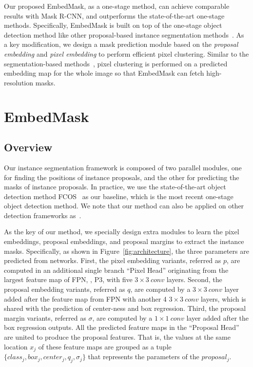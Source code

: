 \documentclass[10pt,twocolumn,letterpaper]{article}
\begin{document}
Our proposed EmbedMask, as a one-stage method, can achieve comparable results with Mask R-CNN, and outperforms the state-of-the-art one-stage methods. 
Specifically, EmbedMask is built on top of the one-stage object detection method like other proposal-based instance segmentation methods~\cite{chen2018masklab,he2017mask}. 
As a key modification, we design a mask prediction module based on the \emph{proposal embedding} and \emph{pixel embedding} to perform efficient pixel clustering. 
Similar to the segmentation-based methods~\cite{de2017semantic,neven2019instance}, pixel clustering is performed on a predicted embedding map for the whole image so that EmbedMask can fetch high-resolution masks. 

\section{EmbedMask}

\subsection{Overview}

Our instance segmentation framework is composed of two parallel modules, one for finding the positions of instance proposals, and the other for predicting the masks of instance proposals. 
In practice, we use the state-of-the-art object detection method FCOS~\cite{tian2019fcos} as our baseline, which is the most recent one-stage object detection method. We note that our method can also be applied on other detection frameworks as~\cite{lin2017focal,liu2016ssd,redmon2016you}.

As the key of our method, we specially design extra modules to learn the pixel embeddings, proposal embeddings, and proposal margins to extract the instance masks.
Specifically, as shown in Figure~\ref{fig:architecture}, the three parameters are predicted from networks. 
First, the pixel embedding variants, referred as $p$, are computed in an additional single branch ``Pixel Head'' originating from the largest feature map of FPN, \ie, P3, with five $3\times3\ conv$ layers.
Second, the proposal embedding variants, referred as $q$, are computed by a $3\times3\ conv$ layer added after the feature map from FPN with another 4 $3\times3\ conv$ layers, which is shared with the prediction of center-ness and box regression.
Third, the proposal margin variants, referred as $\sigma$, are computed by a $1\times1\ conv$ layer added after the box regression outputs. 
All the predicted feature maps in the ``Proposal Head'' are united to produce the proposal features. That is, the values at the same location $x_j$ of these feature maps are grouped as a tuple $\{class_j, box_j, center_j, q_j, \sigma_j\}$ that represents the parameters of the $proposal_j$.
\end{document}
